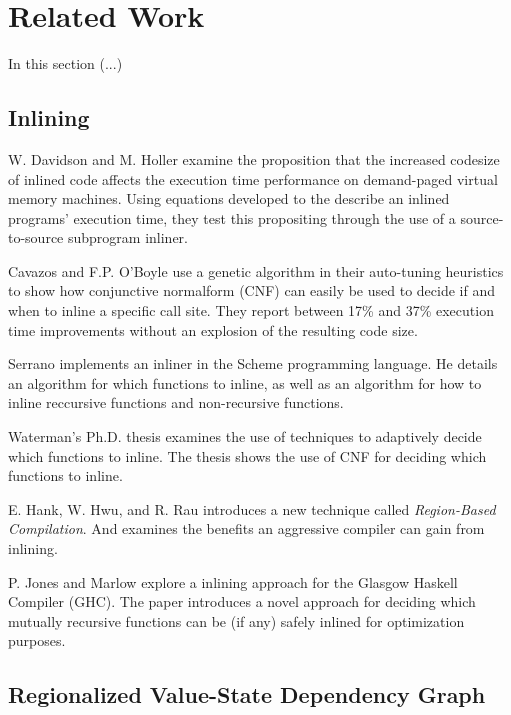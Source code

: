 
\section{Related Work}

In this section (...)

\subsection{Inlining}

W. Davidson and M. Holler \cite{SubprogInlining} examine the proposition that
the increased codesize of inlined code affects the execution time performance on
demand-paged virtual memory machines. Using equations developed to the describe
an inlined programs' execution time, they test this propositing through the use
of a source-to-source subprogram inliner.

Cavazos and F.P. O'Boyle \cite{AutoTuningJavaHeuristics} use a genetic algorithm
in their auto-tuning heuristics to show how conjunctive normalform (CNF) can
easily be used to decide if and when to inline a specific call site. They report
between 17\% and 37\% execution time improvements without an explosion of the resulting code size.

Serrano \cite{InlineWhenHowSerrano} implements an inliner in the Scheme
programming language. He details an algorithm for which functions to inline, as
well as an algorithm for how to inline reccursive functions and non-recursive
functions.

Waterman's Ph.D. thesis \cite{AdaptvCompilAndInlingWaterman} examines the use of
techniques to adaptively decide which functions to inline. The thesis shows the
use of CNF for deciding which functions to inline.

E. Hank, W. Hwu, and R. Rau \cite{RegionBasedCompilationIntroduction} introduces
a new technique called \textit{Region-Based Compilation}. And examines the
benefits an aggressive compiler can gain from inlining.

P. Jones and Marlow \cite{GHCPaper} explore a inlining approach for the Glasgow
Haskell Compiler (GHC). The paper introduces a novel approach for deciding which
mutually recursive functions can be (if any) safely inlined for optimization
purposes.

\subsection{Regionalized Value-State Dependency Graph}
